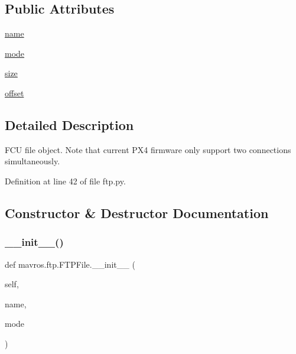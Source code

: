 \subsection*{Public Attributes}
\begin{DoxyCompactItemize}
\item 
\mbox{\hyperlink{classmavros_1_1ftp_1_1FTPFile_a9aa7f5b38e225c1208000bb59ed089e8}{name}}
\item 
\mbox{\hyperlink{classmavros_1_1ftp_1_1FTPFile_a4ca55c2e19240b8792ea85f2ea7ff01a}{mode}}
\item 
\mbox{\hyperlink{classmavros_1_1ftp_1_1FTPFile_a375139e1ed26f06ca4a866626c888a09}{size}}
\item 
\mbox{\hyperlink{classmavros_1_1ftp_1_1FTPFile_a9f517555ac2185b085474fbf6dea481f}{offset}}
\end{DoxyCompactItemize}


\subsection{Detailed Description}
\begin{DoxyVerb}FCU file object.
Note that current PX4 firmware only support two connections simultaneously.
\end{DoxyVerb}
 

Definition at line 42 of file ftp.\+py.



\subsection{Constructor \& Destructor Documentation}
\mbox{\label{classmavros_1_1ftp_1_1FTPFile_ab9ee82f1e229db08bfa039e2b7c53e45}} 
\subsubsection{\texorpdfstring{\_\_init\_\_()}{\_\_init\_\_()}}
{\footnotesize\ttfamily def mavros.\+ftp.\+F\+T\+P\+File.\+\_\+\+\_\+init\+\_\+\+\_\+ (\begin{DoxyParamCaption}\item[{}]{self,  }\item[{}]{name,  }\item[{}]{mode }\end{DoxyParamCaption})}




